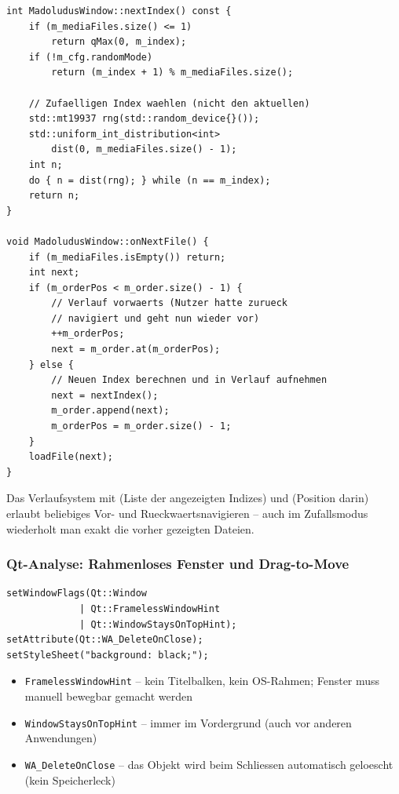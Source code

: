 \begin{lstlisting}[caption={nextIndex und Verlaufslogik}]
int MadoludusWindow::nextIndex() const {
    if (m_mediaFiles.size() <= 1)
        return qMax(0, m_index);
    if (!m_cfg.randomMode)
        return (m_index + 1) % m_mediaFiles.size();

    // Zufaelligen Index waehlen (nicht den aktuellen)
    std::mt19937 rng(std::random_device{}());
    std::uniform_int_distribution<int>
        dist(0, m_mediaFiles.size() - 1);
    int n;
    do { n = dist(rng); } while (n == m_index);
    return n;
}

void MadoludusWindow::onNextFile() {
    if (m_mediaFiles.isEmpty()) return;
    int next;
    if (m_orderPos < m_order.size() - 1) {
        // Verlauf vorwaerts (Nutzer hatte zurueck
        // navigiert und geht nun wieder vor)
        ++m_orderPos;
        next = m_order.at(m_orderPos);
    } else {
        // Neuen Index berechnen und in Verlauf aufnehmen
        next = nextIndex();
        m_order.append(next);
        m_orderPos = m_order.size() - 1;
    }
    loadFile(next);
}
\end{lstlisting}

Das Verlaufsystem mit  (Liste der
angezeigten Indizes) und  (Position
darin) erlaubt beliebiges Vor- und Rueckwaertsnavigieren
-- auch im Zufallsmodus wiederholt man exakt die vorher
gezeigten Dateien.

\subsubsection{Qt-Analyse: Rahmenloses Fenster und Drag-to-Move}

\begin{lstlisting}[caption={Konstruktor: Fenster-Flags}]
setWindowFlags(Qt::Window
             | Qt::FramelessWindowHint
             | Qt::WindowStaysOnTopHint);
setAttribute(Qt::WA_DeleteOnClose);
setStyleSheet("background: black;");
\end{lstlisting}

\begin{itemize}[noitemsep]
  \item \verb|FramelessWindowHint| -- kein Titelbalken,
    kein OS-Rahmen; Fenster muss manuell bewegbar gemacht
    werden
  \item \verb|WindowStaysOnTopHint| -- immer im Vordergrund
    (auch vor anderen Anwendungen)
  \item \verb|WA_DeleteOnClose| -- das Objekt wird beim
    Schliessen automatisch geloescht (kein Speicherleck)
\end{itemize}

